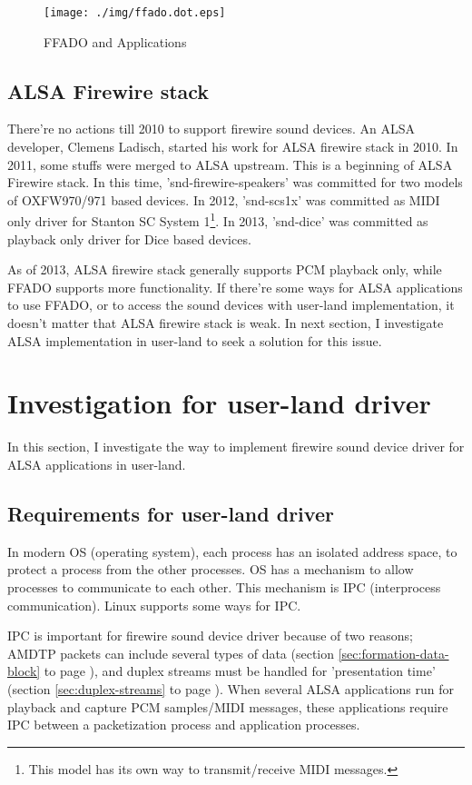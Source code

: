 \documentclass[onecolumn]{article}
\begin{document}
\begin{figure}[H]
	\centering
	\texttt{[image: ./img/ffado.dot.eps]}
	\caption{{FFADO and Applications}}
	\label{ffado_apps}
\end{figure}


\subsection{ALSA Firewire stack}
There're no actions till 2010 to support firewire sound devices. An ALSA developer, Clemens Ladisch, started his work for ALSA firewire stack in 2010. In 2011, some stuffs were merged to ALSA upstream. This is a beginning of ALSA Firewire stack. In this time, 'snd-firewire-speakers' was committed for two models of OXFW970/971 based devices. In 2012, 'snd-scs1x' was committed as MIDI only driver for Stanton SC System 1\footnote{This model has its own way to transmit/receive MIDI messages.}. In 2013, 'snd-dice' was committed as playback only driver for Dice based devices.

As of 2013, ALSA firewire stack generally supports PCM playback only, while FFADO supports more functionality. If there're some ways for ALSA applications to use FFADO, or to access the sound devices with user-land implementation, it doesn't matter that ALSA firewire stack is weak. In next section, I investigate ALSA implementation in user-land to seek a solution for this issue.


\section{Investigation for user-land driver}

In this section, I investigate the way to implement firewire sound device driver for ALSA applications in user-land.

\subsection{Requirements for user-land driver}

In modern OS (operating system), each process has an isolated address space, to protect a process from the other processes. OS has a mechanism to allow processes to communicate to each other. This mechanism is IPC (interprocess communication). Linux supports some ways for IPC.

IPC is important for firewire sound device driver because of two reasons; AMDTP packets can include several types of data (section \ref{sec:formation-data-block} to page \pageref{sec:formation-data-block}), and duplex streams must be handled for 'presentation time' (section \ref{sec:duplex-streams} to page \pageref{sec:duplex-streams}). When several ALSA applications run for playback and capture PCM samples/MIDI messages, these applications require IPC between a packetization process and application processes.
\end{document}
